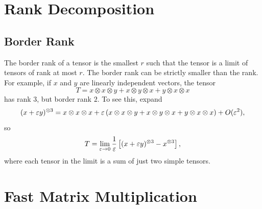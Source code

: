 \section{Rank Decomposition}

\subsection{Border Rank}
The border rank of a tensor is the smallest $r$ such that the tensor is a limit of tensors of rank at most $r$.
The border rank can be strictly smaller than the rank.
For example, if $x$ and $y$ are linearly independent vectors, the tensor
\[
T = x\otimes x\otimes y + x\otimes y\otimes x + y\otimes x\otimes x
\]
has rank $3$, but border rank $2$.
To see this, expand
\[
(x+\varepsilon y)^{\otimes 3}
= x\otimes x\otimes x
+ \varepsilon\,(x\otimes x\otimes y + x\otimes y\otimes x + y\otimes x\otimes x)
+ O(\varepsilon^2),
\]
so
\[
T = \lim_{\varepsilon\to 0} \frac{1}{\varepsilon}\left[(x+\varepsilon y)^{\otimes 3} - x^{\otimes 3}\right],
\]
where each tensor in the limit is a sum of just two simple tensors.

\section{Fast Matrix Multiplication}

